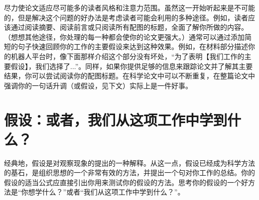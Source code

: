 尽力使论文适应尽可能多的读者风格和注意力范围。虽然这一开始听起来是不可能的，但是解决这个问题的好办法是考虑读者可能会利用的多种途径。例如，读者应该通过阅读摘要、阅读前言或只阅读所有配图的标题，全面了解你所做的内容。（想想其他途径，你处理的每一种都会使你的论文更强大。）通常可以通过添加简短的句子快速回顾你的工作的主要假设来达到这种效果。例如，在材料部分描述你的机器人平台时，像下面那样介绍这个部分没有坏处，“为了表明【我们工作的主要假设】，我们选择了...”。同样，如果你提供足够的信息来跟踪论文并了解其主要结果，你可以尝试阅读你的配图标题。在科学论文中可以不断重复，在整篇论文中强调你的一句话升调（或假设，见下文）实际上是一件好事。


\section{假设：或者，我们从这项工作中学到什么？}
经典地，假设是对观察现象的提出的一种解释。从这一点，假设已经成为科学方法的基石，是组织思想的一个非常有效的方法，并提出一个句对你工作的总结。你的假设的适当公式应直接引出你用来测试你的假设的方法。思考你的假设的一个好方法是“你想学什么？”或者“我们从这项工作中学到什么？”。


